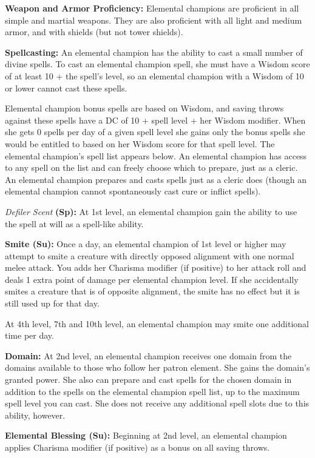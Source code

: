 {
\textbf{Weapon and Armor Proficiency:} Elemental champions are proficient in all simple and martial weapons. They are also proficient with all light and medium armor, and with shields (but not tower shields).

\textbf{Spellcasting:} An elemental champion has the ability to cast a small number of divine spells. To cast an elemental champion spell, she must have a Wisdom score of at least 10 + the spell's level, so an elemental champion with a Wisdom of 10 or lower cannot cast these spells.

Elemental champion bonus spells are based on Wisdom, and saving throws against these spells have a DC of 10 + spell level + her Wisdom modifier. When she gets 0 spells per day of a given spell level she gains only the bonus spells she would be entitled to based on her Wisdom score for that spell level. The elemental champion's spell list appears below. An elemental champion has access to any spell on the list and can freely choose which to prepare, just as a cleric. An elemental champion prepares and casts spells just as a cleric does (though an elemental champion cannot spontaneously cast cure or inflict spells).

\textit{Defiler Scent} \textbf{(Sp):} At 1st level, an elemental champion gain the ability to use the  spell at will as a spell-like ability.

\textbf{Smite (Su):} Once a day, an elemental champion of 1st level or higher may attempt to smite a creature with directly opposed alignment with one normal melee attack. You adds her Charisma modifier (if positive) to her attack roll and deals 1 extra point of damage per elemental champion level. If she accidentally smites a creature that is of opposite alignment, the smite has no effect but it is still used up for that day.

At 4th level, 7th and 10th level, an elemental champion may smite one additional time per day.

\textbf{Domain:} At 2nd level, an elemental champion receives one domain from the domains available to those who follow her patron element. She gains the domain's granted power. She also can prepare and cast spells for the chosen domain in addition to the spells on the elemental champion spell list, up to the maximum spell level you can cast. She does not receive any additional spell slots due to this ability, however.

\textbf{Elemental Blessing (Su):} Beginning at 2nd level, an elemental champion applies  Charisma modifier (if positive) as a bonus on all saving throws.

}
